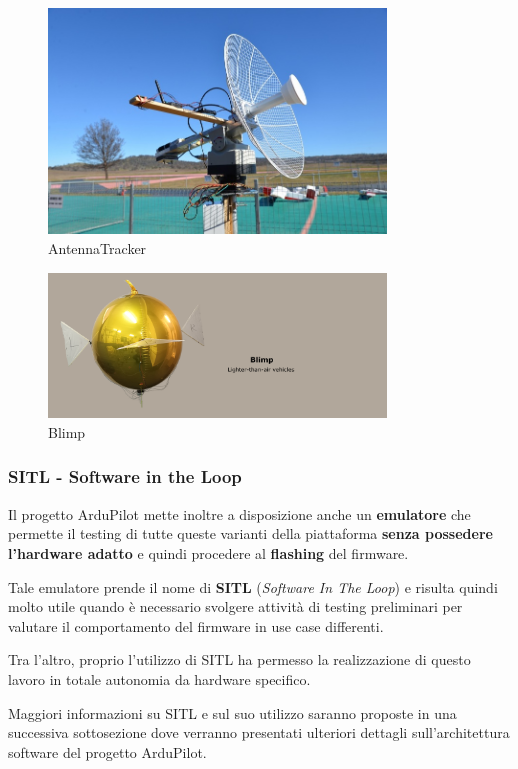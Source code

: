 \documentclass[a4paper, 12pt, oneside]{article}
\begin{document}
\begin{figure}[H]
    \centering
    \includegraphics[width=0.8\textwidth]{images/antenna.jpg}
    \caption{AntennaTracker}
\end{figure}
\begin{figure}[H]
    \centering
    \includegraphics[width=0.8\textwidth]{images/blimp.png}
    \caption{Blimp}
\end{figure}

\subsubsection{SITL - Software in the Loop}
Il progetto ArduPilot mette inoltre a disposizione anche un \textbf{emulatore} che permette il testing di tutte queste varianti della piattaforma \textbf{senza possedere l'hardware adatto} \cite{sitl} e quindi procedere al \textbf{flashing} del firmware. 

Tale emulatore prende il nome di \textbf{SITL} (\textit{Software In The Loop}) e risulta quindi molto utile quando è necessario svolgere attività di testing preliminari per valutare il comportamento del firmware in use case differenti. 

Tra l'altro, proprio l'utilizzo di SITL ha permesso la realizzazione di questo lavoro in totale autonomia da hardware specifico. 

Maggiori informazioni su SITL e sul suo utilizzo saranno proposte in una successiva sottosezione dove verranno presentati ulteriori dettagli sull'architettura software del progetto ArduPilot.
\end{document}
